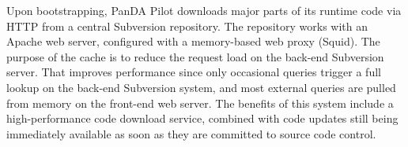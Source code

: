 



Upon bootstrapping, PanDA Pilot downloads major parts of its runtime code via
HTTP from a central Subversion repository. The repository works with an Apache
web server, configured with a memory-based web proxy (Squid). The purpose of the
cache is to reduce the request load on the back-end Subversion server. That
improves performance  since only occasional
queries trigger a full lookup on the back-end Subversion system, and most
external queries are pulled from memory on the front-end web server. The
benefits of this system include a high-performance code download service,
combined with code updates still being immediately available as soon as they are
committed to source code control.

